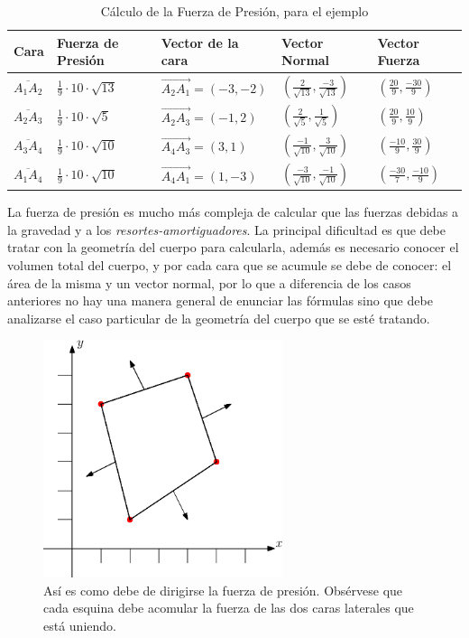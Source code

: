 \begin{table}
\begin{center}
\begin{tabular} {@{}lllll@{}}
\toprule
Cara & Fuerza de Presión &  Vector de la cara & Vector Normal & Vector Fuerza \\ \midrule
$\overline{A_1A_2}$ & $\frac{1}{9} \cdot 10 \cdot \sqrt{13} $ & $\overrightarrow{A_2A_1} = (-3,-2)$ & $(\frac{2}{\sqrt{13}}, \frac{-3}{\sqrt{13}})$ & $(\frac{20}{9}, \frac{-30}{9})$ \\
$\overline{A_2A_3}$ & $\frac{1}{9} \cdot 10 \cdot \sqrt{5} $ & $\overrightarrow{A_2A_3} = (-1,2)$ & $(\frac{2}{\sqrt{5}}, \frac{1}{\sqrt{5}})$ & $(\frac{20}{9}, \frac{10}{9})$ \\
$\overline{A_3A_4}$ & $\frac{1}{9} \cdot 10 \cdot \sqrt{10} $ & $\overrightarrow{A_4A_3} = (3,1)$ & $(\frac{-1}{\sqrt{10}}, \frac{3}{\sqrt{10}})$ & $(\frac{-10}{9}, \frac{30}{9})$ \\
$\overline{A_1A_4}$ & $\frac{1}{9} \cdot 10 \cdot \sqrt{10} $ & $\overrightarrow{A_4A_1} = (1,-3)$ & $(\frac{-3}{\sqrt{10}}, \frac{-1}{\sqrt{10}})$ & $(\frac{-30}{7}, \frac{-10}{9})$ \\ 
\bottomrule
\end{tabular}
\end{center}
\caption[Ejemplo sobre cómo calcular la fuerza de presión]{Cálculo de la Fuerza de Presión, para el ejemplo}
\label{ejemplo:presion}
\end{table}

La fuerza de presión es mucho más compleja de calcular que las fuerzas debidas a la gravedad y a los \emph{resortes-amortiguadores}.
La principal dificultad es que debe tratar con la geometría del cuerpo para calcularla, además es necesario conocer el volumen total del cuerpo, y por cada cara que se acumule se debe de conocer: el área de la misma y un vector normal, por lo que a diferencia de los casos anteriores no hay una manera general de enunciar las fórmulas sino que debe analizarse el caso particular de la geometría del cuerpo que se esté tratando.


\begin{figure}
 \centering
 \includegraphics[width=7cm]{Img/01/presion_bien}
 \caption[Vectores de presión correctos]{ 
 Así es como debe de dirigirse la fuerza de presión. Obsérvese que cada esquina debe acomular la fuerza de las dos caras laterales que está uniendo.
 } \label{presionBien:fig}
\end{figure}
